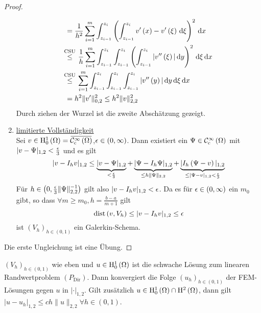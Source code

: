 \begin{proof}
\begin{enumerate}
\begin{align*}
					&= \frac{1}{h^{2}} \sum_{i=1}^{m}\int_{z_{i-1}}^{z_{i}}\left(\int_{z_{i-1}}^{z_{i}}v^{\prime}\left(x\right)-v^{\prime}\left(\xi\right)\d\xi\right)^{2}\d x\\
					&\overset{\mathclap{\text{CSU}}}{\leq}\hspace*{0.5em}\frac{1}{h}\sum_{i=1}^{m}\int_{z_{i-1}}^{z_{i}}\int_{z_{i-1}}^{z_{i}}\left(\int_{z_{i-1}}^{z_{i}}|v^{\prime\prime}\left(\xi\right)|\d y\right)^{2}\d\xi\d x\\
					&\overset{\mathclap{\text{CSU}}}{\leq}\hspace*{0.5em} \sum_{i=1}^{m}\int_{z_{i-1}}^{z_{i}}\int_{z_{i-1}}^{z_{i}}\int_{z_{i-1}}^{z_{i}}|v^{\prime\prime}\left(y\right)|\d y\d\xi\d x\\
					&= h^{2}\|v^{\prime}\|_{0,2}^{2} \leq h^{2}\|v\|_{2,2}^{2}
			\end{align*}
			Durch ziehen der Wurzel ist die zweite Abschätzung gezeigt.
		\item \underline{limitierte Vollständigkeit}\\
		Sei $v\in\H^{1}_{0}\left(\W\right) = \overbar{\C^{\infty}_{\text{c}}\left(\W\right)}$,$\epsilon\in\left(0,\infty\right)$. Dann existiert ein $\Psi\in\mathcal{C}^{\infty}_{\text{c}}\left(\Omega\right)$ mit $|v-\Psi|_{1,2}<\frac{\epsilon}{3}$ und es gilt
		\begin{equation*}
			|v-I_{h}v|_{1,2} \leq \underbrace{|v-\Psi|_{1,2}}_{<\frac{\epsilon}{3}} + \underbrace{|\Psi-I_{h}\Psi|_{1,2}}_{\leq h\|\Psi\|_{2,2}} + \underbrace{|I_{h}\left(\Psi-v\right)|_{1,2}}_{\leq |\Psi-v|_{1,2} < \frac{\epsilon}{3}}
		\end{equation*}
		Für $h\in\left(0,\frac{\epsilon}{3}\|\Psi\|_{2,2}^{-1}\right)$ gilt also $|v-I_{h}v|_{1,2} < \epsilon$. Da es für $\epsilon\in\left(0,\infty\right)$ ein $m_{0}$ gibt, so dass $\forall m\geq m_{0}, h=\frac{b-a}{m+1}$ gilt
		\begin{equation*}
			\operatorname{dist}\left(v,V_{h}\right) \leq |v-I_{h}v|_{1,2} \leq \epsilon
		\end{equation*}
		ist $\left(V_{h}\right)_{h\in\left(0,1\right)}$ ein Galerkin-Schema.
	\end{enumerate}
	Die erste Ungleichung ist eine Übung.
\end{proof}

\begin{lemma}[Korollar]
	$\left(V_{h}\right)_{h\in\left(0,1\right)}$ wie eben und $u\in\mathrm{H}^{1}_{0}\left(\Omega\right)$ ist die schwache Lösung zum linearen Randwertproblem $\left(P_{\text{Dir}}\right)$. Dann konvergiert die Folge $\left(u_{h}\right)_{h\in\left(0,1\right)}$ der FEM-Lösungen gegen $u$ in $|\cdot|_{1,2}$. Gilt zusätzlich \mbox{$u\in\mathrm{H}^{1}_{0}\left(\Omega\right)\cap\mathrm{H}^{2}\left(\Omega\right)$}, dann gilt $|u-u_{h}|_{1,2}\leq ch\|u\|_{2,2}\forall h\in\left(0,1\right)$.
\end{lemma}

